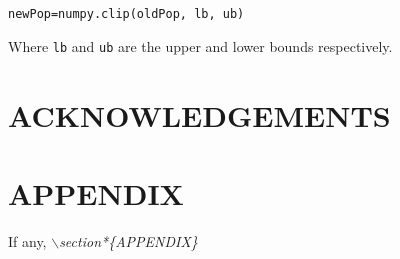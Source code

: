 \documentclass[a4paper,twoside]{article}
\begin{document}
\texttt{newPop=numpy.clip(oldPop, lb, ub)}

Where \texttt{lb} and \texttt{ub} are the upper and lower bounds respectively.


\section*{\uppercase{Acknowledgements}}




\vfill

{\small
}


\section*{\uppercase{Appendix}}

\noindent If any, 
\textit{$\backslash$section*\{APPENDIX\}}

\vfill
\end{document}
